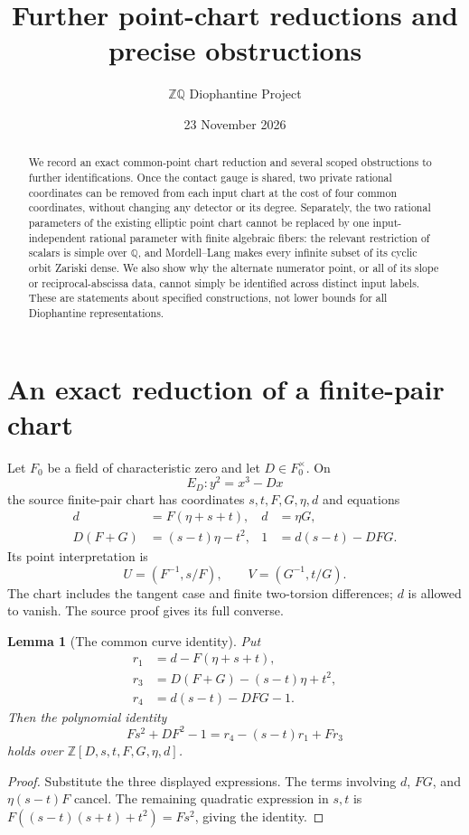 \documentclass[11pt]{article}
\title{Further point-chart reductions and precise obstructions}
\author{\(\mathbb Z\mathbb Q\) Diophantine Project}
\date{23 November 2026}
\newtheorem{lemma}[theorem]{Lemma}
\newcommand{\Q}{\mathbb Q}
\newcommand{\Z}{\mathbb Z}
\begin{document}
\maketitle
\begin{abstract}
We record an exact common-point chart reduction and several scoped
obstructions to further identifications. Once the contact gauge is
shared, two private rational coordinates can be removed from each
input chart at the cost of four common coordinates, without changing
any detector or its degree. Separately, the two rational parameters
of the existing elliptic point chart cannot be replaced by one
input-independent rational parameter with finite algebraic fibers:
the relevant restriction of scalars is simple over \(\Q\), and
Mordell--Lang makes every infinite subset of its cyclic orbit
Zariski dense. We also show why the alternate numerator point,
or all of its slope or reciprocal-abscissa data, cannot simply
be identified across distinct input labels. These are statements
about specified constructions, not lower bounds for all
Diophantine representations.
\end{abstract}

\section{An exact reduction of a finite-pair chart}
\label{sec:chart}

Let \(F_0\) be a field of characteristic zero and let \(D\in
F_0^\times\). On
\[
                         E_D:y^2=x^3-Dx
\]
the source finite-pair chart has coordinates \(s,t,F,G,\eta,d\)
and equations
\begin{align}
 d&=F(\eta+s+t),& d&=\eta G,\label{eq:pair1}\\
 D(F+G)&=(s-t)\eta-t^2,&
 1&=d(s-t)-DFG.\label{eq:pair2}
\end{align}
Its point interpretation is
\[
                U=(F^{-1},s/F),\qquad V=(G^{-1},t/G).
\]
The chart includes the tangent case and finite two-torsion
differences; \(d\) is allowed to vanish. The source proof
\cite[Section 3]{physical} gives its full converse.

\begin{lemma}[The common curve identity]\label{lem:identity}
Put
\[
\begin{split}
 r_1&=d-F(\eta+s+t),\\
 r_3&=D(F+G)-(s-t)\eta+t^2,\\
 r_4&=d(s-t)-DFG-1 .
\end{split}
\]
Then the polynomial identity
\begin{equation}\label{eq:identity}
        Fs^2+DF^2-1=r_4-(s-t)r_1+Fr_3
\end{equation}
holds over \(\Z[D,s,t,F,G,\eta,d]\).
\end{lemma}
\begin{proof}
Substitute the three displayed expressions. The terms involving
\(d\), \(FG\), and \(\eta(s-t)F\) cancel. The remaining
quadratic expression in \(s,t\) is
\(F((s-t)(s+t)+t^2)=Fs^2\), giving the identity.
\end{proof}
\end{document}
